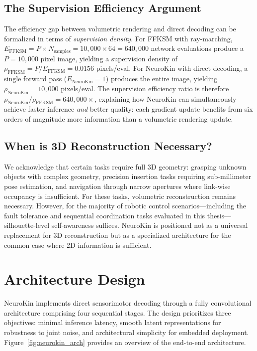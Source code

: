 \documentclass[12pt,a4paper,oneside]{report}
\begin{document}
\subsection{The Supervision Efficiency Argument}
\label{subsec:the_supervision_efficiency_argument}

The efficiency gap between volumetric rendering and direct decoding can be formalized in terms of \textit{supervision density}. For FFKSM with ray-marching, $E_{\text{FFKSM}} = P \times N_{\text{samples}} = 10,000 \times 64 = 640,000$ network evaluations produce a $P = 10,000$ pixel image, yielding a supervision density of $\rho_{\text{FFKSM}} = P/E_{\text{FFKSM}} = 0.0156$ pixels/eval. For NeuroKin with direct decoding, a single forward pass ($E_{\text{NeuroKin}} = 1$) produces the entire image, yielding $\rho_{\text{NeuroKin}} = 10,000$ pixels/eval. The supervision efficiency ratio is therefore $\rho_{\text{NeuroKin}}/\rho_{\text{FFKSM}} = 640,000\times$, explaining how NeuroKin can simultaneously achieve faster inference \textit{and} better quality: each gradient update benefits from six orders of magnitude more information than a volumetric rendering update.

\subsection{When is 3D Reconstruction Necessary?}
\label{subsec:when_is_3d_reconstruction_necessary}

We acknowledge that certain tasks require full 3D geometry: grasping unknown objects with complex geometry, precision insertion tasks requiring sub-millimeter pose estimation, and navigation through narrow apertures where link-wise occupancy is insufficient. For these tasks, volumetric reconstruction remains necessary. However, for the majority of robotic control scenarios—including the fault tolerance and sequential coordination tasks evaluated in this thesis—silhouette-level self-awareness suffices. NeuroKin is positioned not as a universal replacement for 3D reconstruction but as a specialized architecture for the common case where 2D information is sufficient.

\section{Architecture Design}

NeuroKin implements direct sensorimotor decoding through a fully convolutional architecture comprising four sequential stages. The design prioritizes three objectives: minimal inference latency, smooth latent representations for robustness to joint noise, and architectural simplicity for embedded deployment. Figure~\ref{fig:neurokin_arch} provides an overview of the end-to-end architecture.
\end{document}
